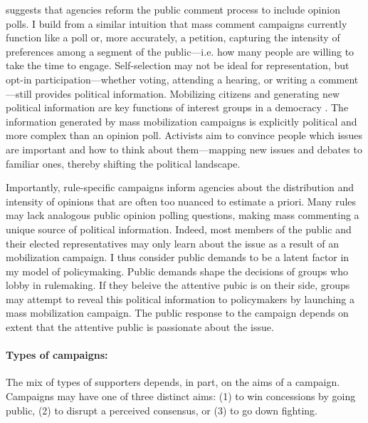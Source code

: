 \citet{Rauch2016} suggests that agencies reform the public comment process to include opinion polls. I build from a similar intuition that mass comment campaigns currently function like a poll or, more accurately, a petition, capturing the intensity of preferences among a segment of the public---i.e. how many people are willing to take the time to engage. Self-selection may not be ideal for representation, but opt-in participation---whether voting, attending a hearing, or writing a comment---still provides political information. 
Mobilizing citizens and generating new political information are key functions of interest groups in a democracy \citep{Mansbridge1992, Mahoney2007}. The information generated by mass mobilization campaigns is explicitly political and more complex than an opinion poll. Activists aim to convince people which issues are important and how to think about them---mapping new issues and debates to familiar ones, thereby shifting the political landscape. 

Importantly, rule-specific campaigns inform agencies about the distribution and intensity of opinions that are often too nuanced to estimate a priori. Many rules may lack analogous public opinion polling questions, making mass commenting a unique source of political information. Indeed, most members of the public and their elected representatives may only learn about the issue as a result of an mobilization campaign. I thus consider public demands to be a latent factor in my model of policymaking. Public demands shape the decisions of groups who lobby in rulemaking. If they beleive the attentive pubic is on their side, groups may attempt to reveal this political information to policymakers by launching a mass mobilization campaign. The public response to the campaign depends on extent that the attentive public is passionate about the issue.








\paragraph{Types of campaigns:} The mix of types of supporters depends, in part, on the aims of a campaign. Campaigns may have one of three distinct aims: (1) to win concessions by going public, (2) to disrupt a perceived consensus, or (3) to go down fighting. 

